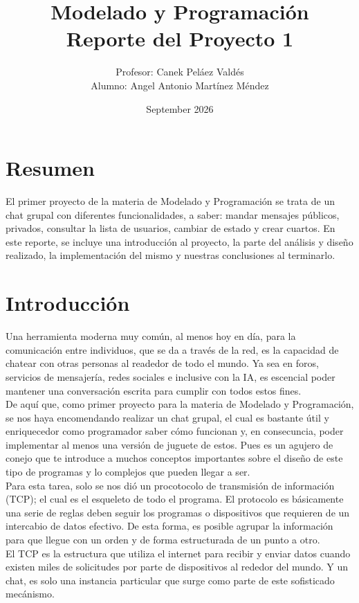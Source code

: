 \documentclass{article}
\title{Modelado y Programación\\
Reporte del Proyecto 1}
\author{Profesor: Canek Peláez Valdés\\
Alumno: Angel Antonio Martínez Méndez}
\date{September 2026}
\begin{document}
\maketitle

\section*{Resumen}

El primer proyecto de la materia de Modelado y Programación se trata de un chat grupal con diferentes funcionalidades, a saber: mandar mensajes públicos, privados, consultar la lista de usuarios, cambiar de estado y crear cuartos. En este reporte, se incluye una introducción al proyecto, la parte del análisis y diseño realizado, la implementación del mismo y nuestras conclusiones al terminarlo.\\

\section*{Introducción}
Una herramienta moderna muy común, al menos hoy en día, para la comunicación entre individuos, que se da a través de la red, es la capacidad de chatear con otras personas al readedor de todo el mundo. Ya sea en foros, servicios de mensajería, redes sociales e inclusive con la IA, es escencial poder mantener una conversación escrita para cumplir con todos estos fines.\\

De aquí que, como primer proyecto para la materia de Modelado y Programación, se nos haya encomendando realizar un chat grupal, el cual es bastante útil y enriquecedor como programador saber cómo funcionan y, en consecuncia, poder implementar al menos una versión de juguete de estos. Pues es un agujero de conejo que te introduce a muchos conceptos importantes sobre el diseño de este tipo de programas y lo complejos que pueden llegar a ser.\\

Para esta tarea, solo se nos dió un procotocolo de transmisión de información (TCP); el cual es el esqueleto de todo el programa. El protocolo es básicamente una serie de reglas deben seguir los programas o dispositivos que requieren de un intercabio de datos efectivo. De esta forma, es posible agrupar la información para que llegue con un orden y de forma estructurada de un punto a otro.\\

El TCP es la estructura que utiliza el internet para recibir y enviar datos cuando existen miles de solicitudes por parte de dispositivos al rededor del mundo. Y un chat, es solo una instancia particular que surge como parte de este sofisticado mecánismo.\\
\end{document}
